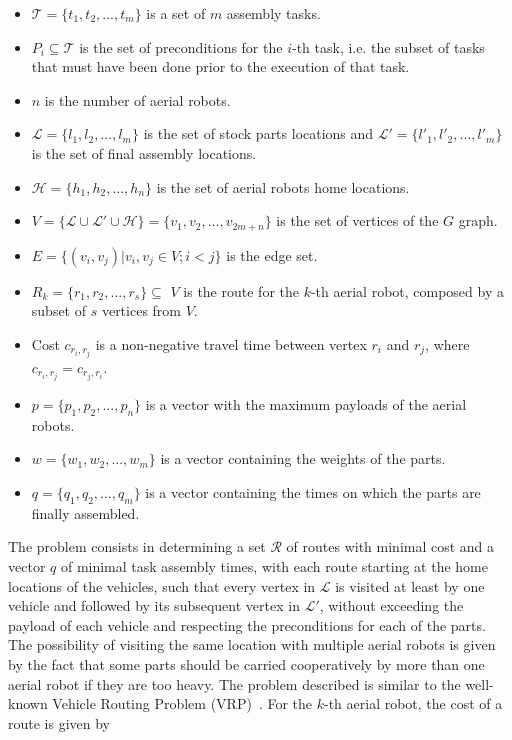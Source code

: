 \documentclass[runningheads,a4paper]{llncs}
\begin{document}
    \begin{itemize}
    	\item $\mathcal{T} = \{t_1, t_2, ..., t_m\}$ is a set of $m$ assembly tasks.
    	\item ${P_{i}} \subseteq \mathcal{T}  $ is the set of preconditions for the $i$-th task, i.e. the subset of tasks that must have been done prior to the execution of that task.
    	\item $n$ is the number of aerial robots.
    	\item $\mathcal{L} = \{l_1, l_2, ..., l_m\}$ is the set of stock parts locations and $\mathcal{L'} = \{l'_1, l'_2, ..., l'_m\}$ is the set of final assembly locations.    
    	\item $\mathcal{H} = \{h_1, h_2, ..., h_n\}$ is the set of aerial robots home locations.
  		\item $V=\{\mathcal{L}\cup\mathcal{L'}\cup\mathcal{H}\}=\{v_1, v_2, ..., v_{2m+n}\}$ is the set of vertices of the $G$ graph.
		\item $E=\{(v_i,v_j) | v_i,v_j \in V; i<j\}$ is the edge set.  		
  		\item ${R_{k} = \{r_1, r_2, ..., r_s} \}\subseteq$ $V$ is the route for the $k$-th aerial robot, composed by a subset of $s$ vertices from $V$.
		\item Cost $c_{r_i,r_j}$ is a non-negative travel time between vertex $r_i$ and $r_j$, where $c_{r_i,r_j}=c_{r_j,r_i}$.
		\item $p = \{p_1, p_2, ..., p_n\}$ is a vector with the maximum payloads of the aerial robots.
		\item $w = \{w_1, w_2, ..., w_m\}$ is a vector containing the weights of the parts.
		\item $q = \{q_1, q_2, ..., q_m\}$ is a vector containing the times on which the parts are finally assembled.
	\end{itemize}
	
The problem consists in determining a set $\mathcal{R}$ of routes with minimal cost and a vector $q$ of minimal task assembly times, with each route starting at the home locations of the vehicles, such that every vertex in $\mathcal{L}$ is visited at least by one vehicle and followed by its subsequent vertex in $\mathcal{L'}$, without exceeding the payload of each vehicle and respecting the preconditions for each of the parts. The possibility of visiting the same location with multiple aerial robots is given by the fact that some parts should be carried cooperatively by more than one aerial robot if they are too heavy. The problem described is similar to the well-known Vehicle Routing Problem (VRP)~\cite{Dantzig_Ramser_VRP}.	
	For the $k$-th aerial robot, the cost of a route is given by 
\end{document}
